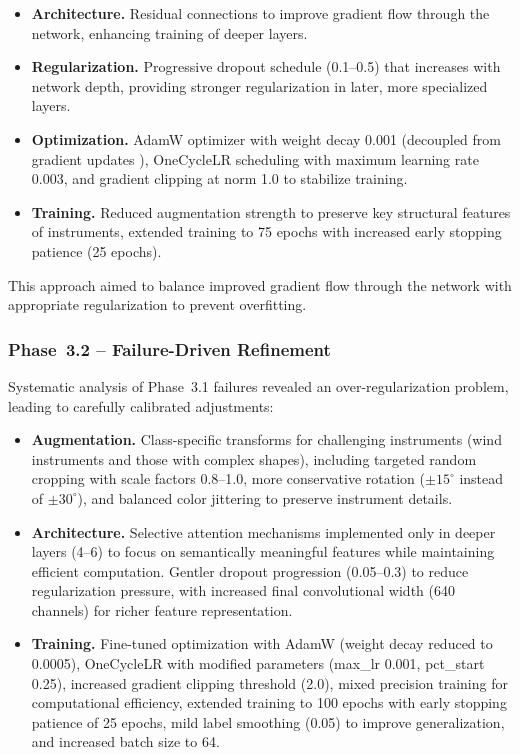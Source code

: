 \begin{itemize}
    \item \textbf{Architecture.} Residual connections to improve gradient flow through the network, enhancing training of deeper layers.
    \item \textbf{Regularization.} Progressive dropout schedule (0.1--0.5) that increases with network depth, providing stronger regularization in later, more specialized layers.
    \item \textbf{Optimization.} AdamW optimizer with weight decay 0.001 (decoupled from gradient updates \cite{loshchilov2017decoupled}), OneCycleLR scheduling with maximum learning rate 0.003, and gradient clipping at norm 1.0 to stabilize training.
    \item \textbf{Training.} Reduced augmentation strength to preserve key structural features of instruments, extended training to 75 epochs with increased early stopping patience (25 epochs).
\end{itemize}

\noindent
This approach aimed to balance improved gradient flow through the network with appropriate regularization to prevent overfitting.

\subsubsection{Phase~3.2 – Failure-Driven Refinement}
\noindent
Systematic analysis of Phase~3.1 failures revealed an over-regularization problem, leading to carefully calibrated adjustments:

\begin{itemize}
    \item \textbf{Augmentation.} Class-specific transforms for challenging instruments (wind instruments and those with complex shapes), including targeted random cropping with scale factors 0.8--1.0, more conservative rotation ($\pm 15^\circ$ instead of $\pm 30^\circ$), and balanced color jittering to preserve instrument details.
    
    \item \textbf{Architecture.} Selective attention mechanisms implemented only in deeper layers (4--6) to focus on semantically meaningful features while maintaining efficient computation. Gentler dropout progression (0.05--0.3) to reduce regularization pressure, with increased final convolutional width (640 channels) for richer feature representation.
    
    \item \textbf{Training.} Fine-tuned optimization with AdamW (weight decay reduced to 0.0005), OneCycleLR with modified parameters (max\_lr 0.001, pct\_start 0.25), increased gradient clipping threshold (2.0), mixed precision training for computational efficiency, extended training to 100 epochs with early stopping patience of 25 epochs, mild label smoothing (0.05) to improve generalization, and increased batch size to 64.
\end{itemize}

